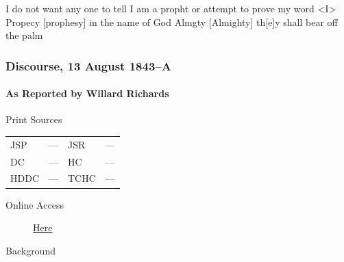 					I do not want any one to tell I am a propht or attempt to prove my word <I> Propecy [prophesy] in the name of God Almgty [Almighty] th[e]y shall bear off the palm
					
		\subsubsection{Discourse, 13 August 1843--A}
			\label{EMS-1843-JS-13-AUG-1843-A}
			
			\paragraph{As Reported by Willard Richards}
				\label{EMS-1843-JS-13-AUG-1843-A-WR}
			
				\begin{description}
					\item[Print Sources]
				\end{description}

					\begin{tabular}{p{0.5in}p{1in}p{0.5in}p{1in}}
					JSP	 	& ---		& JSR 		& --- \\
					DC	 	& ---		& HC 		& --- \\
					HDDC 	& ---		& TCHC 		& --- \\
					\end{tabular}
				
				\begin{description}
					\item[Online Access] \href{https://www.josephsmithpapers.org/paper-summary/discourse-13-august-1843-a-as-reported-by-willard-richards/1}{Here}
				\end{description}
				
				\begin{description}
					\item[Background]
				\end{description}
				
				
